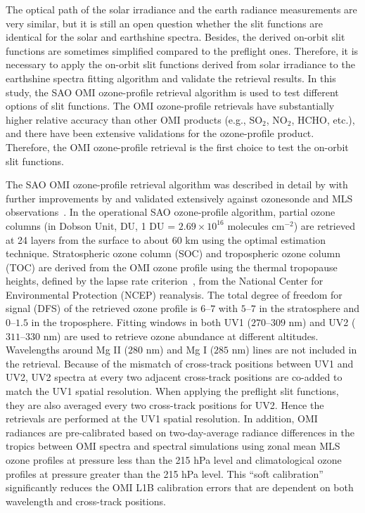 \documentclass[amt,manuscript]{copernicus}
\begin{document}
The optical path of the solar irradiance and the earth radiance measurements are very similar, but it is still an open question whether the slit functions are identical for the solar and earthshine spectra. Besides, the derived on-orbit slit functions are sometimes simplified compared to the preflight ones. Therefore, it is necessary to apply the on-orbit slit functions derived from solar irradiance to the earthshine spectra fitting algorithm and validate the retrieval results. In this study, the SAO OMI ozone-profile retrieval algorithm is used to test different options of slit functions. The OMI ozone-profile retrievals have substantially higher relative accuracy than other OMI products (e.g., SO$_2$, NO$_2$, HCHO, etc.), and there have been extensive validations for the ozone-profile product. Therefore, the OMI ozone-profile retrieval is the first choice to test the on-orbit slit functions.

The SAO OMI ozone-profile retrieval algorithm was described in detail by \citet{liu2010ozone} with further improvements by \citet{bak2013improvement,bak2016improvement} and validated extensively against ozonesonde and MLS observations~\citep{huang2017,huang2017mls}. In the operational SAO ozone-profile algorithm, partial ozone columns (in Dobson Unit, DU, 1 DU = $2.69\times 10^{16}$ molecules cm$^{-2}$) are retrieved at 24 layers from the surface to about $60$ km using the optimal estimation technique. Stratospheric ozone column (SOC) and tropospheric ozone column (TOC) are derived from the OMI ozone profile using the thermal tropopause heights, defined by the lapse rate criterion~\citep{wmo1957definition}, from the National Center for Environmental Protection (NCEP) reanalysis. The total degree of freedom for signal (DFS) of the retrieved ozone profile is $6$--$7$ with $5$--$7$ in the stratosphere and $0$--$1.5$ in the troposphere. Fitting windows in both UV1 ($270$--$309$ nm) and UV2 ($311$--$330$ nm) are used to retrieve ozone abundance at different altitudes. Wavelengths around Mg II ($280$ nm) and Mg I ($285$ nm) lines are not included in the retrieval. Because of the mismatch of cross-track positions between UV1 and UV2, UV2 spectra at every two adjacent cross-track positions are co-added to match the UV1 spatial resolution. When applying the preflight slit functions, they are also averaged every two cross-track positions for UV2. Hence the retrievals are performed at the UV1 spatial resolution. In addition, OMI radiances are pre-calibrated based on two-day-average radiance differences in the tropics between OMI spectra and spectral simulations using zonal mean MLS ozone profiles at pressure less than the 215 hPa level and climatological ozone profiles at pressure greater than the 215 hPa level. This ``soft calibration'' significantly reduces the OMI L1B calibration errors that are dependent on both wavelength and cross-track positions.
\end{document}
